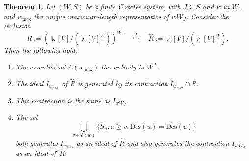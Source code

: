 \documentclass[12pt,dvips]{amsart}
\theoremstyle{plain}
\newtheorem{theorem}{Theorem}[section]
\theoremstyle{definition}
\theoremstyle{remark}
\numberwithin{equation}{section}
\def\Ess{{\mathcal{E}}}
\def\Des{\mathrm{Des}}
\begin{document}
\begin{theorem}
\label{parabolic-generators-theorem}
Let $(W,S)$ be a finite Coxeter system, with $J \subseteq S$ and $w$ in $W$,
and $w_{\max}$ the unique maximum-length representative of $wW_J$. 
Consider the inclusion
$$
R:=\left( \Bbbk[V] / ( \Bbbk[V]^W_+ ) \right)^{W_J} 
\quad
\overset{i}{\hookrightarrow}
\quad
\hat{R}:=\Bbbk[V] / ( \Bbbk[V]^W_+ ).
$$
Then the following hold.
\begin{enumerate}
\item[(i)] The essential set $\Ess(w_{\max})$ lies entirely in $W^J$.
\item[(ii)] The ideal $I_{w_{\max}}$ of $\hat{R}$ is generated by
its contraction $I_{w_{\max}} \cap R$.
\item[(iii)] This contraction is the same as $I_{wW_J}$. 
\item[(iv)] The set 
$$
\bigcup_{v \in \Ess(w)} \{S_u: u \geq v, \Des(u) = \Des(v)\}
$$
both generates $I_{w_{\max}}$ as an ideal of $\hat{R}$ and also generates
the contraction $I_{wW_J}$ as an ideal of~$R$.
\end{enumerate}
\end{theorem}
\end{document}
